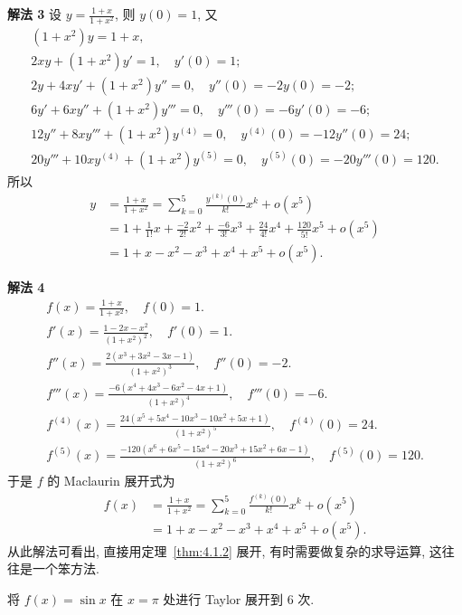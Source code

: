 \begin{solution}
\textbf{解法 3} 设 $y=\frac{1+x}{1+x^{2}}$, 则 $y(0)=1$, 又
\begin{gather*}
(1+x^{2})y=1+x,\\
2xy+(1+x^{2})y'=1,\quad y'(0)=1;\\
2y+4xy'+(1+x^{2})y''=0,\quad y''(0)=-2y(0)=-2;\\
6y'+6xy''+(1+x^{2})y'''=0,\quad y'''(0)=-6y'(0)=-6;\\
12y''+8xy'''+(1+x^{2})y^{(4)}=0,\quad y^{(4)}(0)=-12y''(0)=24;\\
20y'''+10xy^{(4)}+(1+x^{2})y^{(5)}=0,\quad y^{(5)}(0)=-20y'''(0)=120.
\end{gather*}
所以
\begin{align*}
y&=\frac{1+x}{1+x^{2}}=\sum_{k=0}^{5}\frac{y^{(k)}(0)}{k!}x^{k}+o(x^{5})\\
&=1+\frac{1}{1!}x+\frac{-2}{2!}x^{2}+\frac{-6}{3!}x^{3}+\frac{24}{4!}x^{4}+\frac{120}{5!}x^{5}+o(x^{5})\\
&=1+x-x^{2}-x^{3}+x^{4}+x^{5}+o(x^{5}).
\end{align*}

\textbf{解法 4}
\begin{gather*}
f(x)=\frac{1+x}{1+x^{2}},\quad f(0)=1.\\
f'(x)=\frac{1-2x-x^{2}}{(1+x^{2})^{2}},\quad f'(0)=1.\\
f''(x)=\frac{2(x^{3}+3x^{2}-3x-1)}{(1+x^{2})^{3}},\quad f''(0)=-2.\\
f'''(x)=\frac{-6(x^{4}+4x^{3}-6x^{2}-4x+1)}{(1+x^{2})^{4}},\quad f'''(0)=-6.\\
f^{(4)}(x)=\frac{24(x^{5}+5x^{4}-10x^{3}-10x^{2}+5x+1)}{(1+x^{2})^{5}},\quad f^{(4)}(0)=24.\\
f^{(5)}(x)=\frac{-120(x^{6}+6x^{5}-15x^{4}-20x^{3}+15x^{2}+6x-1)}{(1+x^{2})^{6}},\quad f^{(5)}(0)=120.
\end{gather*}
于是 $f$ 的 Maclaurin 展开式为
\begin{align*}
f(x)&=\frac{1+x}{1+x^{2}}=\sum_{k=0}^{5}\frac{f^{(k)}(0)}{k!}x^{k}+o(x^{5})\\
&=1+x-x^{2}-x^{3}+x^{4}+x^{5}+o(x^{5}).
\end{align*}
从此解法可看出, 直接用定理~\ref{thm:4.1.2} 展开, 有时需要做复杂的求导运算, 这往往是一个笨方法.
\end{solution}

\begin{example}\label{ex:4.1.13}
将 $f(x)=\sin x$ 在 $x=\pi$ 处进行 Taylor 展开到 $6$ 次.
\end{example}

